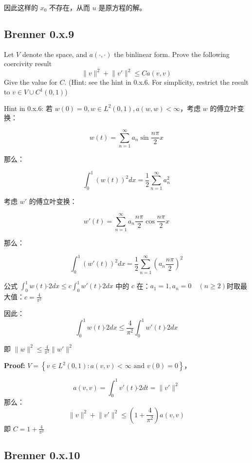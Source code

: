 \documentclass[UTF8]{ctexart}
\begin{document}
因此这样的 \(x_{0}\) 不存在，从而 \(u\) 是原方程的解。

\subsection{Brenner 0.x.9}

Let \(V\) denote the space, and \(a( \cdot , \cdot )\) the binlinear
form. Prove the following coercivity result
\[\left. \parallel v \right.\parallel^{2} + \left. \parallel{v\prime} \right.\parallel^{2} \leq Ca(v,v)\]
Give the value for \(C\). (Hint: see the hint in 0.x.6. For simplicity,
restrict the result to \(v \in V \cup C^{1}(0,1)\))

Hint in 0.x.6: 若 \(w(0) = 0,w \in L^{2}(0,1),a(w,w) < \infty\)，考虑
\(w\) 的傅立叶变换：

\[w(t) = \sum_{n = 1}^{\infty}a_{n}\sin\frac{n\pi}{2}x\]

那么：

\[\int_{0}^{1}\left( w(t) \right)^{2}dx = \frac{1}{2}\sum_{n = 1}^{\infty}a_{n}^{2}\]

考虑 \(w\prime\) 的傅立叶变换：

\[w\prime(t) = \sum_{n = 1}^{\infty}a_{n}\frac{n\pi}{2}\cos\frac{n\pi}{2}x\]

那么：

\[\int_{0}^{1}\left( w\prime(t) \right)^{2}dx = \frac{1}{2}\sum_{n = 1}^{\infty}\left( a_{n}\frac{n\pi}{2} \right)^{2}\]

公式 \(\int_{0}^{1}w(t)\hat{}2dx \leq c\int_{0}^{1}w\prime(t)\hat{}2dx\)
中的 \(c\)
在：\(a_{1} = 1,a_{n} = 0\quad(n \geq 2)\)时取最大值：\(c = \frac{4}{\pi^{2}}\)

因此：\[\int_{0}^{1}w(t)\hat{}2dx \leq \frac{4}{\pi^{2}}\int_{0}^{1}w\prime(t)\hat{}2dx\]

即
\(\left. \parallel w \right.\parallel^{2} \leq \frac{4}{\pi^{2}}\left. \parallel{w\prime} \right.\parallel^{2}\)

\textbf{Proof:}
\(V = \left\{ v \in L^{2}(0,1):a(v,v) < \infty\text{ and }v(0) = 0 \right\}\)，

\[a(v,v) = \int_{0}^{1}v\prime(t)\hat{}2dt = \left. \parallel{v\prime} \right.\parallel^{2}\]
那么：
\[\left. \parallel v \right.\parallel^{2} + \left. \parallel{v\prime} \right.\parallel^{2} \leq \left( 1 + \frac{4}{\pi^{2}} \right)a(v,v)\]
即 \(C = 1 + \frac{4}{\pi^{2}}\)

\subsection{Brenner 0.x.10}
\end{document}

